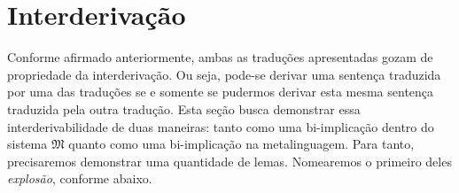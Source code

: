 \section{Interderivação}

Conforme afirmado anteriormente, ambas as traduções apresentadas gozam de propriedade da interderivação.
Ou seja, pode-se derivar uma sentença traduzida por uma das traduções se e somente se pudermos derivar esta mesma sentença traduzida pela outra tradução.
Esta seção busca demonstrar essa interderivabilidade de duas maneiras: tanto como uma bi-implicação dentro do sistema $\mathfrak{M}$ quanto como uma bi-implicação na metalinguagem.
Para tanto, precisaremos demonstrar uma quantidade de lemas.
Nomearemos o primeiro deles \emph{explosão}, conforme abaixo.

\vspace{.5\baselineskip}
